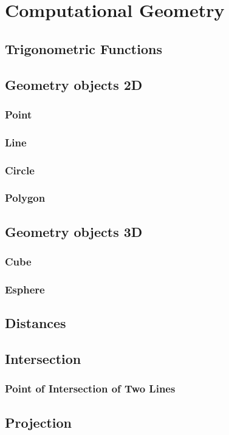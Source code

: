 \chapter{Computational Geometry}
	\section{Trigonometric Functions}
	\section{Geometry objects 2D}
		\subsection{Point}
		\subsection{Line}
		\subsection{Circle}
		\subsection{Polygon}
	\section{Geometry objects 3D}
		\subsection{Cube}
		\subsection{Esphere}
	\section{Distances}
	\section{Intersection}
		\subsection{Point of Intersection of Two Lines}
	\section{Projection}
